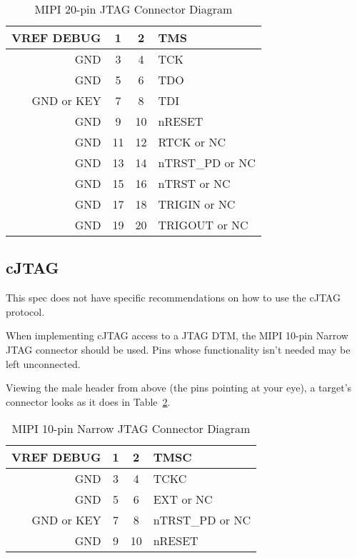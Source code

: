 \begin{table}[H]
    \centering
    \caption{MIPI 20-pin JTAG Connector Diagram}
    \label{tab:mipitwenty}
    \begin{tabular}{|r|c|c|l|}
        \hline
        VREF DEBUG & 1 & 2 & TMS \\
        \hline
        GND & 3 & 4 & TCK \\
        \hline
        GND & 5 & 6 & TDO \\
        \hline
        GND or KEY & 7 & 8 & TDI \\
        \hline
        GND & 9 & 10 & nRESET \\
        \hline
        GND & 11 & 12 & RTCK or NC \\
        \hline
        GND & 13 & 14 & nTRST\_PD or NC \\
        \hline
        GND & 15 & 16 & nTRST or NC \\
        \hline
        GND & 17 & 18 & TRIGIN or NC \\
        \hline
        GND & 19 & 20 & TRIGOUT or NC \\
        \hline
    \end{tabular}
\end{table}

\subsection{cJTAG}

This spec does not have specific recommendations on how to use the cJTAG
protocol.

When implementing cJTAG access to a JTAG DTM, the MIPI 10-pin Narrow JTAG
connector should be used. Pins whose functionality isn't needed may be left
unconnected.

Viewing the male header from above (the pins pointing
at your eye), a target's connector looks as it does in
Table~\ref{tab:mipicjtag}.

\begin{table}[htp]
    \centering
    \caption{MIPI 10-pin Narrow JTAG Connector Diagram}
    \label{tab:mipicjtag}
    \begin{tabular}{|r|c|c|l|}
        \hline
        VREF DEBUG & 1 & 2 & TMSC \\
        \hline
        GND & 3 & 4 & TCKC \\
        \hline
        GND & 5 & 6 & EXT or NC \\
        \hline
        GND or KEY & 7 & 8 & nTRST\_PD or NC \\
        \hline
        GND & 9 & 10 & nRESET \\
        \hline
    \end{tabular}
\end{table}
